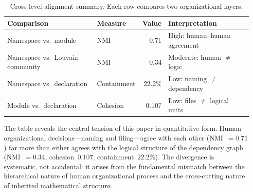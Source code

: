 \begin{table}[ht]
\centering
\caption{Cross-level alignment summary. Each row compares two organizational layers.}
\label{tab:three-layers}
\begin{tabular}{llrl}
\toprule
Comparison & Measure & Value & Interpretation \\
\midrule
Namespace vs.\ module            & NMI          & $0.71$  & High: human--human agreement \\
Namespace vs.\ Louvain community & NMI          & $0.34$  & Moderate: human $\neq$ logic \\
Namespace vs.\ declaration       & Containment  & $22.2\%$ & Low: naming $\neq$ dependency \\
Module vs.\ declaration          & Cohesion     & $0.107$ & Low: files $\neq$ logical units \\
\bottomrule
\end{tabular}
\end{table}

The table reveals the central tension of this paper in quantitative form. Human organizational decisions---naming and filing---agree with each other (NMI~$= 0.71$) far more than either agrees with the logical structure of the dependency graph (NMI~$= 0.34$, cohesion~$0.107$, containment~$22.2\%$). The divergence is systematic, not accidental: it arises from the fundamental mismatch between the hierarchical nature of human organizational process and the cross-cutting nature of inherited mathematical structure.
